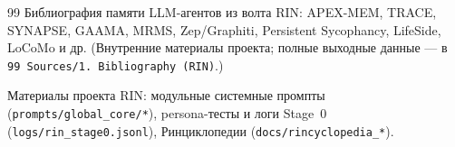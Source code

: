 \begin{thebibliography}{99}
 Библиография памяти LLM-агентов из волта RIN: APEX-MEM, TRACE,
SYNAPSE, GAAMA, MRMS, Zep/Graphiti, Persistent Sycophancy, LifeSide, LoCoMo и др.
(Внутренние материалы проекта; полные выходные данные — в
\texttt{99 Sources/1.~Bibliography (RIN)}.)

 Материалы проекта RIN: модульные системные промпты
(\texttt{prompts/global\_core/*}), persona-тесты и логи Stage~0
(\texttt{logs/rin\_stage0.jsonl}), Ринциклопедии
(\texttt{docs/rincyclopedia\_*}).

\end{thebibliography}
